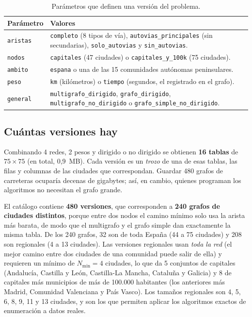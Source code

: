 \begin{table}[htbp]
  \centering
  \caption{Parámetros que definen una versión del problema.}\label{tab:parametros}
  \small
  \begin{tabularx}{\linewidth}{@{}l X@{}}
    \toprule
    Parámetro & Valores \\
    \midrule
    \texttt{aristas} & \texttt{completo} (8 tipos de vía), \texttt{autovias\_principales} (sin secundarias), \texttt{solo\_autovias} y \texttt{sin\_autovias}. \\
    \texttt{nodos} & \texttt{capitales} (47 ciudades) o \texttt{capitales\_y\_100k} (75 ciudades). \\
    \texttt{ambito} & \texttt{espana} o una de las 15 comunidades autónomas peninsulares. \\
    \texttt{peso} & \texttt{km} (kilómetros) o \texttt{tiempo} (segundos, el registrado en el grafo). \\
    \texttt{general} & \texttt{multigrafo\_dirigido}, \texttt{grafo\_dirigido}, \texttt{multigrafo\_no\_dirigido} o \texttt{grafo\_simple\_no\_dirigido}. \\
    \bottomrule
  \end{tabularx}
\end{table}

\subsection{Cuántas versiones hay}

Combinando 4 redes, 2 pesos y dirigido o no dirigido se obtienen \textbf{16 tablas} de $75\times 75$ (en total, 0,9~MB). Cada versión es un \emph{trozo} de una de esas tablas, las filas y columnas
de las ciudades que correspondan. Guardar 480 grafos de carreteras ocuparía decenas de gigabytes; así, en cambio, quienes programan los algoritmos no necesitan el grafo grande.

El catálogo contiene \textbf{480 versiones}, que corresponden a \textbf{240 grafos de ciudades distintos}, porque entre dos nodos el camino mínimo solo usa la arista más barata, de modo que el multigrafo y el grafo simple
dan exactamente la misma tabla. De los 240 grafos, 32 son de toda España (44 a 75 ciudades) y 208 son regionales (4 a 13 ciudades). Las versiones regionales usan \emph{toda la red} (el mejor camino entre dos ciudades de una
comunidad puede salir de ella) y requieren un mínimo de $N_{\min}=4$ ciudades, lo que da 5 conjuntos de capitales (Andalucía, Castilla y León, Castilla-La Mancha, Cataluña y Galicia) y 8 de capitales más municipios de más de 100.000 habitantes
(los anteriores más Madrid, Comunidad Valenciana y País Vasco). Los tamaños regionales son 4, 5, 6, 8, 9, 11 y 13 ciudades, y son los que permiten aplicar los algoritmos exactos de enumeración a datos reales.

